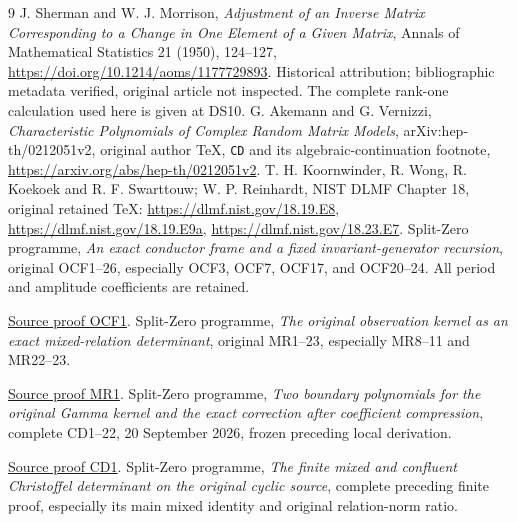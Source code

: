\documentclass[11pt]{article}
\begin{document}
\begin{thebibliography}{9}
 J. Sherman and W. J. Morrison,
\emph{Adjustment of an Inverse Matrix Corresponding to a Change in One
Element of a Given Matrix}, Annals of Mathematical Statistics
21 (1950), 124--127,
\url{https://doi.org/10.1214/aoms/1177729893}.
Historical attribution; bibliographic metadata verified, original article
not inspected. The complete rank-one calculation used here is given at DS10.
 G. Akemann and G. Vernizzi,
\emph{Characteristic Polynomials of Complex Random Matrix Models},
arXiv:hep-th/0212051v2, original author TeX, \texttt{CD} and its
algebraic-continuation footnote,
\url{https://arxiv.org/abs/hep-th/0212051v2}.
 T. H. Koornwinder, R. Wong, R. Koekoek and
R. F. Swarttouw; W. P. Reinhardt, NIST DLMF Chapter 18,
original retained TeX:
\url{https://dlmf.nist.gov/18.19.E8},
\url{https://dlmf.nist.gov/18.19.E9a},
\url{https://dlmf.nist.gov/18.23.E7}.
 Split-Zero programme,
\emph{An exact conductor frame and a fixed invariant-generator
recursion}, original OCF1--26, especially OCF3, OCF7, OCF17,
and OCF20--24. All period and amplitude coefficients are retained.

\href{https://github.com/KokunoYumeto/zeta-function-research-reader/blob/5992ad50c0f2a06921f1fcaded7b4e38097c0739/workbenches/splitzero-tandem/continuations/20260920-original-kernel-mixed-determinants/providers/ORIGINAL_CONDUCTOR_STRIP_FRAME.tex\#L27}{Source proof OCF1}.
 Split-Zero programme,
\emph{The original observation kernel as an exact mixed-relation
determinant}, original MR1--23, especially MR8--11 and MR22--23.

\href{https://github.com/KokunoYumeto/zeta-function-research-reader/blob/5992ad50c0f2a06921f1fcaded7b4e38097c0739/workbenches/splitzero-tandem/continuations/20260920-original-kernel-mixed-determinants/ORIGINAL_KERNEL_MIXED_DETERMINANT.tex\#L36}{Source proof MR1}.
 Split-Zero programme,
\emph{Two boundary polynomials for the original Gamma kernel and the
exact correction after coefficient compression}, complete CD1--22,
20 September 2026, frozen preceding local derivation.

\href{https://github.com/KokunoYumeto/zeta-function-research-reader/blob/main/workbenches/splitzero-tandem/continuations/20260921-kernel-degree-steps/COMPLETE_CD_BOUNDARY.tex\#L42}{Source proof CD1}.
 Split-Zero programme,
\emph{The finite mixed and confluent Christoffel determinant on the
original cyclic source}, complete preceding finite proof, especially
its main mixed identity and original relation-norm ratio.


\end{thebibliography}
\end{document}
